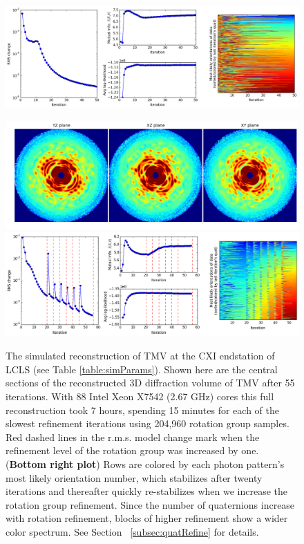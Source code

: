 \documentclass[]{iucr}              %
\begin{document}
\begin{figure}
\includegraphics[height=0.15\textheight]{figures/amo_low_log.png} \label{fig:amo_low_log}
\end{figure}

\begin{figure}
\caption{The simulated reconstruction of TMV at the CXI endstation of LCLS (see Table \ref{table:simParams}). Shown here are the central sections of the reconstructed 3D diffraction volume of TMV after 55 iterations. With 88 Intel Xeon X7542 (2.67 GHz) cores this full reconstruction took 7 hours, spending 15 minutes for each of the slowest refinement iterations using 204,960 rotation group samples. Red dashed lines in the r.m.s. model change mark when the refinement level of the rotation group was increased by one. ({\bf Bottom right plot}) Rows are colored by each photon pattern's most likely orientation number, which stabilizes after twenty iterations and thereafter quickly re-stabilizes when we increase the rotation group refinement. Since the number of quaternions increase with rotation refinement, blocks of higher refinement show a wider color spectrum. See Section ~\ref{subsec:quatRefine} for details.}
\includegraphics[width=\textwidth]{figures/cxi_intens_055.png} \label{fig:cxi_intens}
\includegraphics[width=\textwidth]{figures/cxi_log_fig.png} \label{fig:cxi_log}
\end{figure}
\end{document}
